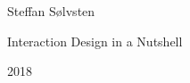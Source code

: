 \begin{titlepage}
  \pagecolor{YellowOrange}\afterpage{\nopagecolor}
  \begin{adjustwidth*}{}{}
    \raggedleft

    \vspace*{1cm}
    {\LARGE Steffan S\o lvsten}
    
    \vspace*{2cm}
    {\Huge Interaction Design in a Nutshell}

    \vspace*{15cm}
    {\large 2018}
  \end{adjustwidth*}
\end{titlepage}

